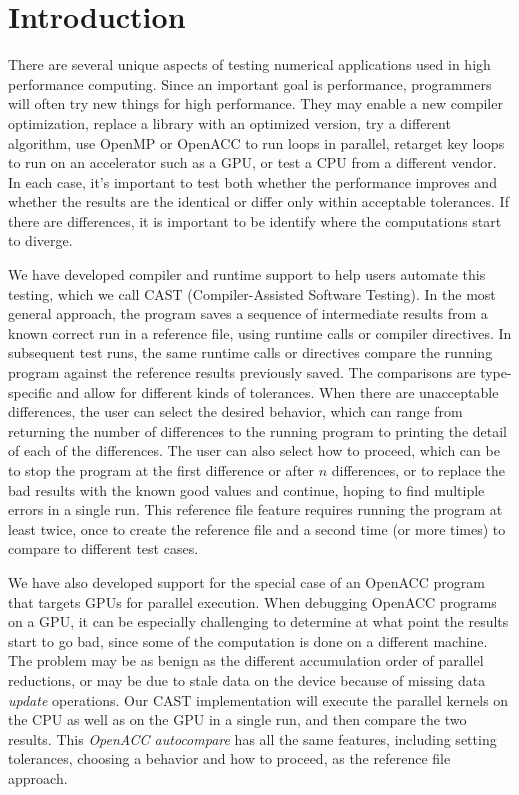 \section{Introduction}

There are several unique aspects of testing numerical applications used in high performance computing.
Since an important goal is performance, programmers will often try new things for high performance.
They may enable a new compiler optimization, replace a library with an optimized version, try a different algorithm, use OpenMP or OpenACC to run loops in parallel, retarget key loops to run on an accelerator such as a GPU, or test a CPU from a different vendor.
In each case, it's important to test both whether the performance improves and whether the results are the identical or differ only within acceptable tolerances.
If there are differences, it is important to be identify where the computations start to diverge.

We have developed compiler and runtime support to help users automate this testing, which we call CAST (Compiler-Assisted Software Testing).
In the most general approach, the program saves a sequence of intermediate results from a known correct run in a reference file, using runtime calls or compiler directives.
In subsequent test runs, the same runtime calls or directives compare the running program against the reference results previously saved.
The comparisons are type-specific and allow for different kinds of tolerances.
When there are unacceptable differences, the user can select the desired behavior, which can range from returning the number of differences to the running program to printing the detail of each of the differences.
The user can also select how to proceed, which can be to stop the program at the first difference or after $n$ differences, or to replace the bad results with the known good values and continue, hoping to find multiple errors in a single run.
This reference file feature requires running the program at least twice, once to create the reference file and a second time (or more times) to compare to different test cases.

We have also developed support for the special case of an OpenACC program that targets GPUs for parallel execution.
When debugging OpenACC programs on a GPU, it can be especially challenging to determine at what point the results start to go bad, since some of the computation is done on a different machine.
The problem may be as benign as the different accumulation order of parallel reductions, or may be due to stale data on the device because of missing data \emph{update} operations.
Our CAST implementation will execute the parallel kernels on the CPU as well as on the GPU in a single run, and then compare the two results.
This \emph{OpenACC autocompare} has all the same features, including setting tolerances, choosing a behavior and how to proceed, as the reference file approach.

